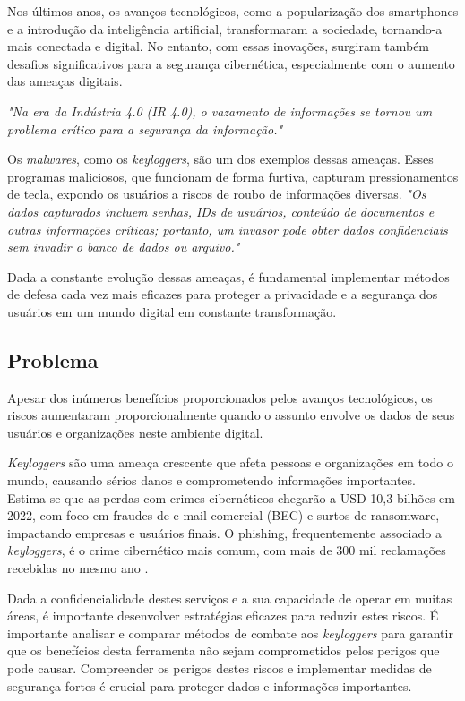 \documentclass[12pt]{article}
\begin{document}
Nos últimos anos, os avanços tecnológicos, como a popularização dos smartphones e a introdução da inteligência artificial, transformaram a sociedade, tornando-a mais conectada e digital. No entanto, com essas inovações, surgiram também desafios significativos para a segurança cibernética, especialmente com o aumento das ameaças digitais.

\textit{"Na era da Indústria 4.0 (IR 4.0), o vazamento de informações se
tornou um problema crítico para a segurança da informação."} \citep{bhaharin2019issues}

Os \textit{malwares}, como os \textit{keyloggers}, são um dos exemplos dessas ameaças. 
Esses programas maliciosos, que funcionam de forma furtiva, capturam pressionamentos de tecla,
expondo os usuários a riscos de roubo de informações diversas. \textit{"Os dados
capturados incluem senhas, IDs de usuários, conteúdo de documentos
e outras informações críticas; portanto, um invasor pode obter dados
confidenciais sem invadir o banco de dados ou arquivo."} \citep{ahmed2014survey}

Dada a constante evolução dessas ameaças, é fundamental implementar métodos de defesa cada vez mais eficazes para proteger a privacidade e a segurança dos usuários em um mundo digital em constante transformação.

\subsection{Problema}


Apesar dos inúmeros benefícios proporcionados pelos avanços tecnológicos, os riscos aumentaram proporcionalmente quando o assunto envolve os dados de seus usuários e organizações neste ambiente digital.

\textit{Keyloggers} são uma ameaça crescente que afeta pessoas e organizações em todo o mundo, causando sérios danos e comprometendo informações importantes. Estima-se que as perdas com crimes cibernéticos chegarão a USD 10,3 bilhões em 2022, com foco em fraudes de e-mail comercial (BEC) e surtos de ransomware, impactando empresas e usuários finais. O phishing, frequentemente associado a \textit{keyloggers}, é o crime cibernético mais comum, com mais de 300 mil reclamações recebidas no mesmo ano \citep{securityintelligence2023}.

Dada a confidencialidade destes serviços e a sua capacidade de operar em muitas áreas, é importante desenvolver estratégias eficazes para reduzir estes riscos. É importante analisar e comparar métodos de combate aos \textit{keyloggers} para garantir que os benefícios desta ferramenta não sejam comprometidos pelos perigos que pode causar. Compreender os perigos destes riscos e implementar medidas de segurança fortes é crucial para proteger dados e informações importantes.
\end{document}
